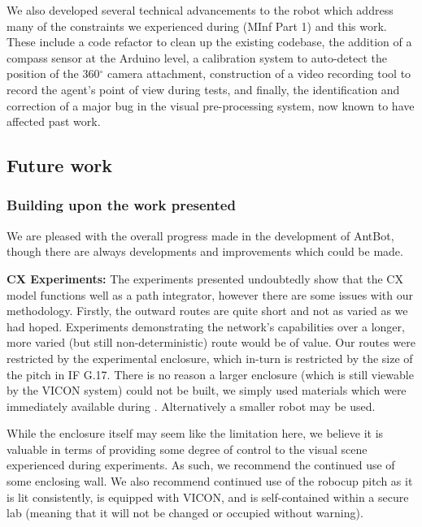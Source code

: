 \documentclass[a4paper,11pt,twoside,openright]{article}
\begin{document}
We also developed several technical advancements to the robot which
address many of the constraints we experienced during
\cite{Mitchell2018} (MInf Part 1) and this work. These include a code refactor to
clean up the existing codebase, the addition of a compass sensor at
the Arduino level, a calibration system to auto-detect the position of
the 360$^\circ$ camera attachment, construction of a video recording
tool to record the agent's point of view during tests, and finally,
the identification and correction of a major bug in the visual
pre-processing system, now known to have affected past work.

\subsection{Future work}
\subsubsection{Building upon the work presented}\label{sec:future}
We are pleased with the overall progress made in the development of
AntBot, though there are always developments and improvements which
could be made.
\newline\par

\textbf{CX Experiments:} The experiments presented undoubtedly show
that the CX model functions well as a path integrator, however there
are some issues with our methodology. Firstly, the outward routes are
quite short and not as varied as we had hoped. Experiments
demonstrating the network's capabilities over a longer, more varied
(but still non-deterministic) route would be of value. Our routes were
restricted by the experimental enclosure, which in-turn is restricted
by the size of the pitch in IF G.17. There is no reason a larger
enclosure (which is still viewable by the VICON system) could not be
built, we simply used materials which were immediately available
during \cite{Mitchell2018}. Alternatively a smaller robot may be used.
\newline\par

While the enclosure itself may seem like the limitation here, we
believe it is valuable in terms of providing some degree of control to
the visual scene experienced during experiments. As such, we recommend
the continued use of some enclosing wall. We also recommend continued
use of the robocup pitch as it is lit consistently, is equipped with
VICON, and is self-contained within a secure lab (meaning that it will
not be changed or occupied without warning).
\newline\par
\end{document}

